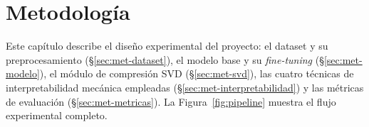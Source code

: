 %

\section{Metodología}
\label{sec:metodologia-tfg}

Este capítulo describe el diseño experimental del proyecto: el dataset y su
preprocesamiento (\S\ref{sec:met-dataset}), el modelo base y su \emph{fine-tuning}
(\S\ref{sec:met-modelo}), el módulo de compresión SVD (\S\ref{sec:met-svd}),
las cuatro técnicas de interpretabilidad mecánica empleadas
(\S\ref{sec:met-interpretabilidad}) y las métricas de evaluación
(\S\ref{sec:met-metricas}). La Figura~\ref{fig:pipeline} muestra el flujo
experimental completo.



